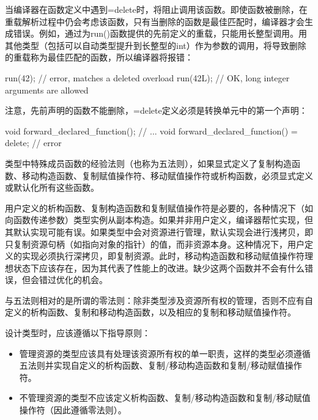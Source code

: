 当编译器在函数定义中遇到=delete时，将阻止调用该函数。即使函数被删除，在重载解析过程中仍会考虑该函数，只有当删除的函数是最佳匹配时，编译器才会生成错误。例如，通过为run()函数提供的先前定义的重载，只能用长整型调用。用其他类型（包括可以自动类型提升到长整型的int）作为参数的调用，将导致删除的重载称为最佳匹配的函数，所以编译器将报错：

\begin{cpp}
run(42);  // error, matches a deleted overload
run(42L); // OK, long integer arguments are allowed
\end{cpp}

注意，先前声明的函数不能删除，=delete定义必须是转换单元中的第一个声明：

\begin{cpp}
void forward_declared_function();
// ...
void forward_declared_function() = delete; // error
\end{cpp}

类型中特殊成员函数的经验法则（也称为五法则），如果显式定义了复制构造函数、移动构造函数、复制赋值操作符、移动赋值操作符或析构函数，必须显式定义或默认化所有这些函数。

用户定义的析构函数、复制构造函数和复制赋值操作符是必要的，各种情况下（如向函数传递参数）类型实例从副本构造。如果并非用户定义，编译器帮忙实现，但其默认实现可能有误。如果类型中会对资源进行管理，默认实现会进行浅拷贝，即只复制资源句柄（如指向对象的指针）的值，而非资源本身。这种情况下，用户定义的实现必须执行深拷贝，即复制资源。此时，移动构造函数和移动赋值操作符理想状态下应该存在，因为其代表了性能上的改进。缺少这两个函数并不会有什么错误，但会错过优化的机会。

与五法则相对的是所谓的零法则：除非类型涉及资源所有权的管理，否则不应有自定义的析构函数、复制和移动构造函数，以及相应的复制和移动赋值操作符。

设计类型时，应该遵循以下指导原则：

\begin{itemize}
\item
管理资源的类型应该具有处理该资源所有权的单一职责，这样的类型必须遵循五法则并实现自定义的析构函数、复制/移动构造函数和复制/移动赋值操作符。

\item
不管理资源的类型不应该定义析构函数、复制/移动构造函数和复制/移动赋值操作符（因此遵循零法则）。
\end{itemize}









